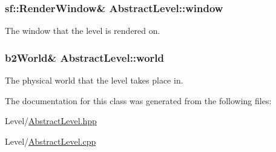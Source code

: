 \subsubsection[{window}]{\setlength{\rightskip}{0pt plus 5cm}sf\+::\+Render\+Window\& Abstract\+Level\+::window\hspace{0.3cm}{\ttfamily [protected]}}\label{class_abstract_level_a3332e1be17da924be26064ac4e089721}
The window that the level is rendered on. \hypertarget{class_abstract_level_a566499434bbd056afd9e12b971e8a41e}{}
\subsubsection[{world}]{\setlength{\rightskip}{0pt plus 5cm}b2\+World\& Abstract\+Level\+::world\hspace{0.3cm}{\ttfamily [protected]}}\label{class_abstract_level_a566499434bbd056afd9e12b971e8a41e}
The physical world that the level takes place in. 

The documentation for this class was generated from the following files\+:\begin{DoxyCompactItemize}
\item 
Level/\hyperlink{_abstract_level_8hpp}{Abstract\+Level.\+hpp}\item 
Level/\hyperlink{_abstract_level_8cpp}{Abstract\+Level.\+cpp}\end{DoxyCompactItemize}
